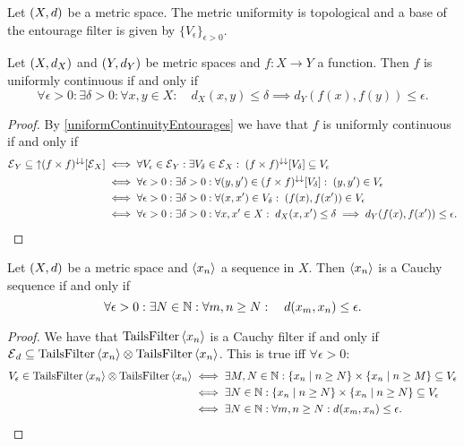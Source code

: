 \begin{lemma}
Let $\left( X,d \right)$ be a metric space. The metric uniformity is topological and a base of the entourage filter is given by $\{V_\epsilon\}_{\epsilon>0}$.
\end{lemma}
\begin{corollary}
Let $\left( X, d_X \right)$ and $\left( Y, d_Y \right)$ be metric spaces and $f:X\to Y$ a function. Then $f$ is uniformly continuous \textup{if and only if}
\[ \forall \epsilon >0: \exists \delta >0: \forall x,y\in X: \quad d_X(x,y) \leq \delta \implies d_Y(f(x), f(y)) \leq \epsilon. \]
\end{corollary}
\begin{proof}
By \ref{uniformContinuityEntourages} we have that $f$ is uniformly continuous \textup{if and only if}
\begin{align*}
\operatorname{\mathcal{E}}_Y \subseteq \operatorname{\uparrow}(f\times f)^{\downarrow\downarrow}[\operatorname{\mathcal{E}}_X] &\iff \forall V_\epsilon \in \operatorname{\mathcal{E}}_Y: \exists V_\delta \in \operatorname{\mathcal{E}}_X: \; (f\times f)^{\downarrow\downarrow}[V_\delta] \subseteq V_\epsilon \\
&\iff \forall \epsilon>0: \exists \delta>0: \forall (y,y')\in (f\times f)^{\downarrow\downarrow}[V_\delta]: \; (y,y')\in V_\epsilon \\
&\iff \forall \epsilon>0: \exists \delta>0: \forall (x,x')\in V_\delta:\; (f(x),f(x'))\in V_\epsilon \\
&\iff \forall \epsilon>0: \exists \delta>0: \forall x,x'\in X: \; d_X(x,x')\leq \delta \implies d_Y(f(x),f(x'))\leq \epsilon.
\end{align*}
\end{proof}

\begin{lemma}
Let $\left( X,d \right)$ be a metric space and $\left\langle x_n \right\rangle$ a sequence in $X$. Then $\left\langle x_n \right\rangle$ is a Cauchy sequence \textup{if and only if}
\[ \forall \epsilon >0: \exists N\in\mathbb{N}: \forall m,n \geq N: \quad d(x_m, x_n)\leq \epsilon. \]
\end{lemma}
\begin{proof}
We have that $\operatorname{TailsFilter}\left\langle x_n \right\rangle$ is a Cauchy filter \textup{if and only if} $\operatorname{\mathcal{E}}_d \subseteq \operatorname{TailsFilter}\left\langle x_n \right\rangle\otimes \operatorname{TailsFilter}\left\langle x_n \right\rangle$. This is true iff $\forall \epsilon>0$:
\begin{align*}
V_\epsilon \in \operatorname{TailsFilter}\left\langle x_n \right\rangle\otimes \operatorname{TailsFilter}\left\langle x_n \right\rangle &\iff \exists M,N\in\mathbb{N}: \left\{ x_n \;\middle|\; n\geq N \right\}\times\left\{ x_n \;\middle|\; n\geq M \right\} \subseteq V_\epsilon \\
&\iff \exists N\in\mathbb{N}: \left\{ x_n \;\middle|\; n\geq N \right\}\times\left\{ x_n \;\middle|\; n\geq N \right\} \subseteq V_\epsilon \\
&\iff \exists N\in\mathbb{N}: \forall m,n \geq N: d(x_m, x_n)\leq \epsilon.
\end{align*}
\end{proof}

